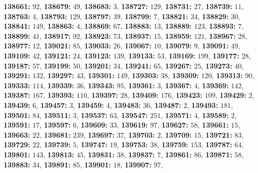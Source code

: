 \textsf{\bfseries 138661:} $92$, \textsf{\bfseries 138679:} $49$, \textsf{\bfseries 138683:} $3$, \textsf{\bfseries 138727:} $129$, \textsf{\bfseries 138731:} $27$, \textsf{\bfseries 138739:} $11$, \textsf{\bfseries 138763:} $4$, \textsf{\bfseries 138793:} $129$, \textsf{\bfseries 138797:} $39$, \textsf{\bfseries 138799:} $7$, \textsf{\bfseries 138821:} $34$, \textsf{\bfseries 138829:} $30$, \textsf{\bfseries 138841:} $149$, \textsf{\bfseries 138863:} $4$, \textsf{\bfseries 138869:} $67$, \textsf{\bfseries 138883:} $13$, \textsf{\bfseries 138889:} $123$, \textsf{\bfseries 138893:} $7$, \textsf{\bfseries 138899:} $41$, \textsf{\bfseries 138917:} $92$, \textsf{\bfseries 138923:} $73$, \textsf{\bfseries 138937:} $15$, \textsf{\bfseries 138959:} $121$, \textsf{\bfseries 138967:} $28$, \textsf{\bfseries 138977:} $12$, \textsf{\bfseries 139021:} $85$, \textsf{\bfseries 139033:} $26$, \textsf{\bfseries 139067:} $10$, \textsf{\bfseries 139079:} $9$, \textsf{\bfseries 139091:} $49$, \textsf{\bfseries 139109:} $42$, \textsf{\bfseries 139121:} $24$, \textsf{\bfseries 139123:} $139$, \textsf{\bfseries 139133:} $53$, \textsf{\bfseries 139169:} $199$, \textsf{\bfseries 139177:} $28$, \textsf{\bfseries 139187:} $57$, \textsf{\bfseries 139199:} $50$, \textsf{\bfseries 139201:} $34$, \textsf{\bfseries 139241:} $65$, \textsf{\bfseries 139267:} $25$, \textsf{\bfseries 139273:} $40$, \textsf{\bfseries 139291:} $132$, \textsf{\bfseries 139297:} $43$, \textsf{\bfseries 139301:} $149$, \textsf{\bfseries 139303:} $38$, \textsf{\bfseries 139309:} $120$, \textsf{\bfseries 139313:} $90$, \textsf{\bfseries 139333:} $114$, \textsf{\bfseries 139339:} $36$, \textsf{\bfseries 139343:} $95$, \textsf{\bfseries 139361:} $3$, \textsf{\bfseries 139367:} $4$, \textsf{\bfseries 139369:} $142$, \textsf{\bfseries 139387:} $167$, \textsf{\bfseries 139393:} $110$, \textsf{\bfseries 139397:} $28$, \textsf{\bfseries 139409:} $176$, \textsf{\bfseries 139423:} $109$, \textsf{\bfseries 139429:} $2$, \textsf{\bfseries 139439:} $6$, \textsf{\bfseries 139457:} $3$, \textsf{\bfseries 139459:} $4$, \textsf{\bfseries 139483:} $36$, \textsf{\bfseries 139487:} $2$, \textsf{\bfseries 139493:} $181$, \textsf{\bfseries 139501:} $84$, \textsf{\bfseries 139511:} $3$, \textsf{\bfseries 139537:} $63$, \textsf{\bfseries 139547:} $251$, \textsf{\bfseries 139571:} $4$, \textsf{\bfseries 139589:} $2$, \textsf{\bfseries 139591:} $17$, \textsf{\bfseries 139597:} $6$, \textsf{\bfseries 139609:} $33$, \textsf{\bfseries 139619:} $97$, \textsf{\bfseries 139627:} $58$, \textsf{\bfseries 139661:} $15$, \textsf{\bfseries 139663:} $22$, \textsf{\bfseries 139681:} $239$, \textsf{\bfseries 139697:} $37$, \textsf{\bfseries 139703:} $2$, \textsf{\bfseries 139709:} $15$, \textsf{\bfseries 139721:} $83$, \textsf{\bfseries 139729:} $22$, \textsf{\bfseries 139739:} $5$, \textsf{\bfseries 139747:} $19$, \textsf{\bfseries 139753:} $38$, \textsf{\bfseries 139759:} $153$, \textsf{\bfseries 139787:} $64$, \textsf{\bfseries 139801:} $143$, \textsf{\bfseries 139813:} $45$, \textsf{\bfseries 139831:} $38$, \textsf{\bfseries 139837:} $7$, \textsf{\bfseries 139861:} $86$, \textsf{\bfseries 139871:} $58$, \textsf{\bfseries 139883:} $34$, \textsf{\bfseries 139891:} $85$, \textsf{\bfseries 139901:} $18$, \textsf{\bfseries 139907:} $97$, 
